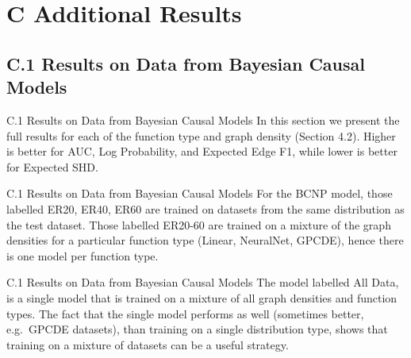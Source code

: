 \documentclass[aspectratio=169,10pt]{beamer}
\begin{document}
\section{C Additional Results}
\subsection{C.1 Results on Data from Bayesian Causal Models}

\begin{frame}{C.1 Results on Data from Bayesian Causal Models}
\small
In this section we present the full results for each of the function type and graph density (Section 4.2). Higher is better for AUC, Log Probability, and Expected Edge F1, while lower is better for Expected SHD.
\end{frame}

\begin{frame}{C.1 Results on Data from Bayesian Causal Models}
\small
For the BCNP model, those labelled ER20, ER40, ER60 are trained on datasets from the same distribution as the test dataset. Those labelled ER20-60 are trained on a mixture of the graph densities for a particular function type (Linear, NeuralNet, GPCDE), hence there is one model per function type.
\end{frame}

\begin{frame}{C.1 Results on Data from Bayesian Causal Models}
\small
The model labelled All Data, is a single model that is trained on a mixture of all graph densities and function types. The fact that the single model performs as well (sometimes better, e.g.\ GPCDE datasets), than training on a single distribution type, shows that training on a mixture of datasets can be a useful strategy.
\end{frame}
\end{document}
